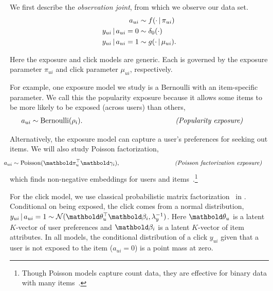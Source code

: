 We first describe the \textit{observation joint}, from which we
observe our data set.
\begin{align*}
  a_{ui} & \sim f(\cdot \,\vert\, \pi_{ui}) \\
  y_{ui} \,\vert\, a_{ui}=0 & \sim \delta_{0}(\cdot) \\
  y_{ui} \,\vert\, a_{ui}=1 & \sim g(\cdot \,\vert\, \mu_{ui}).
\end{align*}

Here the exposure and click models are generic.  Each is governed by
the exposure parameter $\pi_{ui}$ and click parameter $\mu_{ui}$,
respectively.

For example, one exposure model we study is a Bernoulli with an
item-specific parameter.  We call this the popularity exposure because
it allows some items to be more likely to be exposed (across users)
than others,
\begin{align}
\kern-1em a_{ui} &\sim \mathrm{Bernoulli}(\rho_i). & \qquad\qquad\qquad\qquad\qquad\qquad\textit{(Popularity exposure)} &
  \label{eq:popularity}
\end{align}

Alternatively, the exposure model can capture a user's preferences for
seeking out items.  We will also study Poisson factorization,
\begin{align}
  \kern-1em a_{ui} &\sim \textrm{Poisson}(\mb\pi_u^\top \mb\gamma_i),
  & \qquad\qquad\qquad\qquad\textit{(Poisson factorization exposure)}&
  \label{eq:poisson-factorization}
\end{align} which finds
non-negative embeddings for users and
items~\citep{Gopalan:2015}.\footnote{Though Poisson models capture
  count data, they are effective for binary data with many
  items~\citep{Gopalan:2015}.}

For the click model, we use classical probabilistic matrix
factorization~\citep{mnih2007probabilistic} in . Conditional on being
exposed, the click comes from a normal distribution,
$y_{ui} \g a_{ui} = 1 \sim \cN(\mb\theta_u^\top \mb\beta_i,
\lambda_y^{-1})$.
Here $\mb\theta_u$ is a latent $K$-vector of user preferences and
$\mb\beta_i$ is a latent $K$-vector of item attributes. In all models,
the conditional distribution of a click $y_{ui}$ given that a user is
not exposed to the item ($a_{ui} = 0$) is a point mass at zero.


